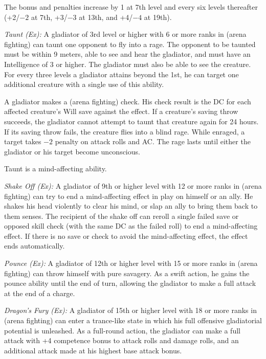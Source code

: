 The bonus and penalties increase by 1 at 7th level and every six levels thereafter (+2/$-2$ at 7th, +3/$-3$ at 13th, and +4/$-4$ at 19th).

\textit{Taunt (Ex):} A gladiator of 3rd level or higher with 6 or more ranks in  (arena fighting) can taunt one opponent to fly into a rage. The opponent to be taunted must be within 9 meters, able to see and hear the gladiator, and must have an Intelligence of 3 or higher. The gladiator must also be able to see the creature. For every three levels a gladiator attains beyond the 1st, he can target one additional creature with a single use of this ability.

A gladiator makes a  (arena fighting) check. His check result is the DC for each affected creature's Will save against the effect. If a creature's saving throw succeeds, the gladiator cannot attempt to taunt that creature again for 24 hours. If its saving throw fails, the creature flies into a blind rage. While enraged, a target takes $-2$ penalty on attack rolls and AC. The rage lasts until either the gladiator or his target become unconscious.

Taunt is a mind-affecting ability.

\textit{Shake Off (Ex):} A gladiator of 9th or higher level with 12 or more ranks in  (arena fighting) can try to end a mind-affecting effect in play on himself or an ally. He shakes his head violently to clear his mind, or slap an ally to bring them back to them senses. The recipient of the shake off can reroll a single failed save or opposed skill check (with the same DC as the failed roll) to end a mind-affecting effect. If there is no save or check to avoid the mind-affecting effect, the effect ends automatically.

\textit{Pounce (Ex):} A gladiator of 12th or higher level with 15 or more ranks in  (arena fighting) can throw himself with pure savagery. As a swift action, he gains the pounce ability until the end of turn, allowing the gladiator to make a full attack at the end of a charge.

\textit{Dragon's Fury (Ex):} A gladiator of 15th or higher level with 18 or more ranks in  (arena fighting) can enter a trance-like state in which his full offensive gladiatorial potential is unleashed. As a full-round action, the gladiator can make a full attack with +4 competence bonus to attack rolls and damage rolls, and an additional attack made at his highest base attack bonus.

